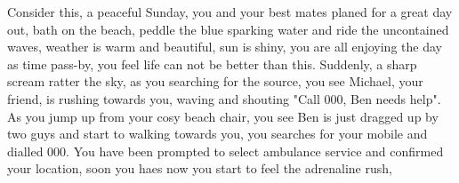 Consider this, a peaceful Sunday, you and your best mates planed for a great day out, bath on the beach, peddle the blue sparking water and ride the uncontained waves, weather is warm and beautiful, sun is shiny, you are all enjoying the day as time pass-by, you feel life can not be better than this. Suddenly, a sharp scream ratter the sky, as you searching for the source, you see Michael, your friend, is rushing towards you, waving and shouting "Call 000, Ben needs help". As you jump up from your cosy beach chair, you see Ben is just dragged up by two guys and start to walking towards you, you searches for your mobile and dialled 000. You have been prompted to select ambulance service and confirmed your location, soon you haes now you start to feel the adrenaline rush,  